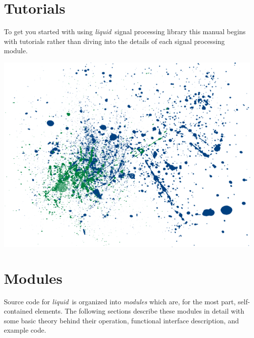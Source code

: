 \documentclass[11pt,twoside]{article}
\newcommand{\liquid}{{\it liquid}}
\begin{document}
\part{Tutorials}
\label{part:tutorials}

\bigskip
\noindent
To get you started with using \liquid\ signal processing library
this manual begins with tutorials rather than diving into the details of
each signal processing module.

\vfill

\includegraphics[width=\textwidth]{graphics/liquid_splatter_02.png}

\vfill



%



%
%
\newpage
\part{Modules}
\label{part:modules}

\bigskip
\noindent
Source code for \liquid\ is organized into {\em modules} which are, for
the most part, self-contained elements.
The following sections describe these modules in detail
with some basic theory behind their operation,
functional interface description,
and example code.

\vfill
\end{document}
